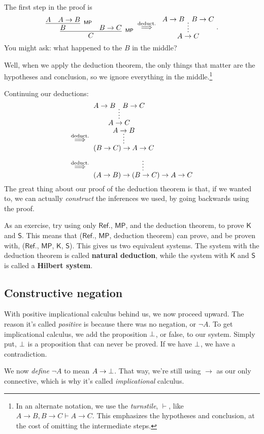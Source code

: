 \documentclass[11pt,paper=letter]{scrartcl}
\newcommand{\sf}{\mathsf}
\renewcommand{\lnot}{\neg}
\newcommand{\vc}[1]{\vcenter{\hbox{#1}}}
\begin{document}
The first step in the proof is
\[
\vc{\infer[^\sf{MP}]
{C}
{
\infer[^\sf{MP}]{B}{A & A \to B}
& B \to C
}}
\;\overset{\text{deduct.}}{\implies}\;
\vc{
\infer*
{A \to C}
{A \to B & B \to C}
}.
\]
You might ask: what happened to the $B$ in the middle?

Well, when we apply the deduction theorem, the only things that matter are the hypotheses and conclusion, so we ignore everything in the middle.\footnote{In an alternate notation, we use the \textit{turnstile}, $\vdash$, like $A \to B, B \to C \vdash A \to C$. This emphasizes the hypotheses and conclusion, at the cost of omitting the intermediate steps.}

Continuing our deductions:
\begin{align*}
&
\vc{
\infer*
{A \to C}
{A \to B & B \to C}
}\\
\;\overset{\text{deduct.}}{\implies}\;&
\vc{
\infer*
{(B \to C) \to A \to C}
{A \to B}
}\\
\;\overset{\text{deduct.}}{\implies}\;&
\vc{
\infer*
{(A \to B) \to (B \to C) \to A \to C}
{\phantom{A}}
}
\end{align*}
The great thing about our proof of the deduction theorem is that, if we wanted to, we can actually \emph{construct} the inferences we used, by going backwards using the proof.

As an exercise, try using only $\sf{Ref.}$, $\sf{MP}$, and the deduction theorem, to prove $\sf{K}$ and $\sf{S}$. This means that ($\sf{Ref.}$, $\sf{MP}$, deduction theorem) can prove, and be proven with, ($\sf{Ref.}$, $\sf{MP}$, $\sf{K}$, $\sf{S}$). This gives us two equivalent systems. The system with the deduction theorem is called \textbf{natural deduction}, while the system with $\sf{K}$ and $\sf{S}$ is called a \textbf{Hilbert system}.

\subsection{Constructive negation}

With positive implicational calculus behind us, we now proceed upward. The reason it's called \emph{positive} is because there was no negation, or $\lnot A$. To get implicational calculus, we add the proposition $\bot$, or false, to our system. Simply put, $\bot$ is a proposition that can never be proved. If we have $\bot$, we have a contradiction.

We now \emph{define} $\lnot A$ to mean $A \to \bot$. That way, we're still using $\to$ as our only connective, which is why it's called \emph{implicational} calculus.
\end{document}
